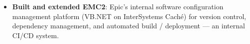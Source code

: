 \documentclass{resume-v2}
\begin{document}
\begin{itemize}
  \item \textbf{Built and extended EMC2}: Epic's internal software configuration management platform (VB.NET on InterSystems Caché) for version control, dependency management, and automated build / deployment --- an internal CI/CD system.

\end{itemize}
\end{document}
